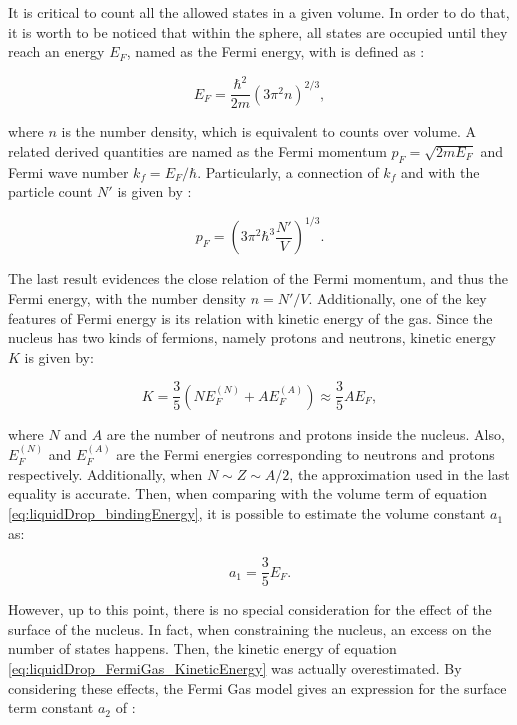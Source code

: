 \documentclass[openany]{book}
\begin{document}
It is critical to count all the allowed states in a given volume. In order to do that, it is worth to be noticed that within the sphere, all states are occupied until they reach an energy $E_F$, named as the Fermi energy, with is defined as \cite{basdevant_rich_spiro_2004}:

\begin{equation}\label{eq:liquidDrop_FermiGas_FermiEnergy}
	E_F = \frac{\hbar^2}{2m}(3\pi^2 n)^{2/3},
\end{equation}

where $n$ is the number density, which is equivalent to counts over volume. A related derived quantities are named as the Fermi momentum $p_F = \sqrt{2mE_F}$ and Fermi wave number $k_f = E_F/\hbar$.  Particularly, a connection of $k_f$ and with the particle count $N'$ is given by \cite{bohr_mottelson_1998}: 

\begin{equation}\label{eq:liquidDrop_FermiGas_momentum}
	p_F =  \left( 3 \pi^2 \hbar^3 \frac{N' }{V}\right)^{1/3}.
\end{equation}

The last result evidences the close relation of the Fermi momentum, and thus the Fermi energy, with the number density $n = N'/V$. Additionally, one of the key features of Fermi energy is its relation with kinetic energy of the gas. Since the nucleus has two kinds of fermions, namely protons and neutrons,  kinetic energy $K$ is given by:

\begin{equation}\label{eq:liquidDrop_FermiGas_KineticEnergy}
	K = \frac{3}{5} \left( N E^{(N)}_F + A E^{(A)}_F \right) \approx \frac{3}{5} A E_F,
\end{equation}

where $N$ and $A$ are the number of neutrons and protons inside the nucleus. Also, $E^{(N)}_F $ and $E^{(A)}_F$ are the Fermi energies corresponding to neutrons and protons respectively.  Additionally, when $N \sim Z \sim A/2$, the approximation used in the last equality is accurate. Then, when comparing with the volume term of equation \ref{eq:liquidDrop_bindingEnergy}, it is possible to estimate the volume constant $a_1$ as: 

\begin{equation}\label{eq:liquidDrop_FermiGas_volumeConstant}
	a_1= \frac{3}{5}E_F.
\end{equation}

However, up to this point, there is no special consideration for the effect of the surface of the nucleus. In fact, when constraining the nucleus, an excess on the number of states happens. Then, the kinetic energy of equation \ref{eq:liquidDrop_FermiGas_KineticEnergy} was actually overestimated. By considering these effects, the Fermi Gas model gives an expression for the surface term constant $a_2$ of \cite{basdevant_rich_spiro_2004}: 
\end{document}
